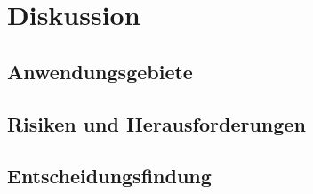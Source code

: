 \section{Diskussion}

\subsection{Anwendungsgebiete}

\subsection{Risiken und Herausforderungen}

\subsection{Entscheidungsfindung}